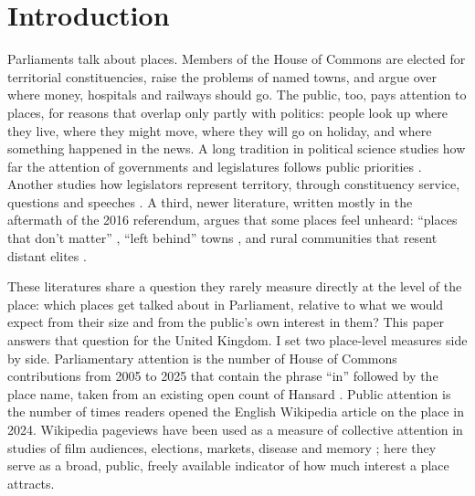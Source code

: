 \documentclass[11pt,a4paper]{article}
\begin{document}
\section{Introduction}
Parliaments talk about places. Members of the House of Commons are elected for territorial constituencies, raise the problems of named towns, and argue over where money, hospitals and railways should go. The public, too, pays attention to places, for reasons that overlap only partly with politics: people look up where they live, where they might move, where they will go on holiday, and where something happened in the news. A long tradition in political science studies how far the attention of governments and legislatures follows public priorities \citep{BaumgartnerJones1993,JonesBaumgartner2005,JenningsJohn2009,BevanJennings2014}. Another studies how legislators represent territory, through constituency service, questions and speeches \citep{CainFerejohnFiorina1987,NortonWood1993,Searing1994,Martin2011,Russo2011,Kellermann2016,Zittel2019}. A third, newer literature, written mostly in the aftermath of the 2016 referendum, argues that some places feel unheard: ``places that don't matter'' \citep{RodriguezPose2018}, ``left behind'' towns \citep{JenningsStoker2016,McCann2020}, and rural communities that resent distant elites \citep{Cramer2016}.

These literatures share a question they rarely measure directly at the level of the place: which places get talked about in Parliament, relative to what we would expect from their size and from the public's own interest in them? This paper answers that question for the United Kingdom. I set two place-level measures side by side. Parliamentary attention is the number of House of Commons contributions from 2005 to 2025 that contain the phrase ``in'' followed by the place name, taken from an existing open count of Hansard \citep{Hotham2026}. Public attention is the number of times readers opened the English Wikipedia article on the place in 2024. Wikipedia pageviews have been used as a measure of collective attention in studies of film audiences, elections, markets, disease and memory \citep{Mestyan2013,YasseriBright2016,Moat2013,Generous2014,GarciaGavilanes2017}; here they serve as a broad, public, freely available indicator of how much interest a place attracts.
\end{document}
